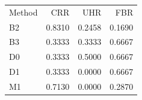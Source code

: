 \begin{tabular}{lrrr}
Method & CRR & UHR & FBR \\
B2 & 0.8310 & 0.2458 & 0.1690 \\
B3 & 0.3333 & 0.3333 & 0.6667 \\
D0 & 0.3333 & 0.5000 & 0.6667 \\
D1 & 0.3333 & 0.0000 & 0.6667 \\
M1 & 0.7130 & 0.0000 & 0.2870 \\
\end{tabular}
